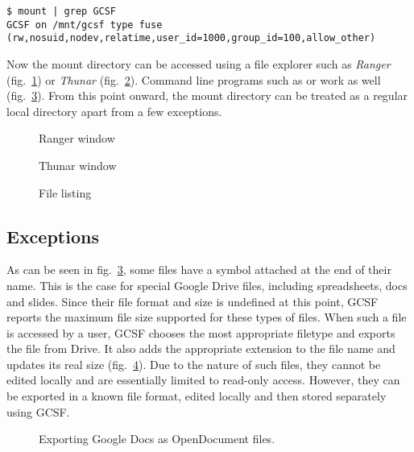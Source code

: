 \begin{lstlisting}[basicstyle=\footnotesize\ttfamily,caption=Output of mount,frame=single,label=mount_output,float]
$ mount | grep GCSF
GCSF on /mnt/gcsf type fuse (rw,nosuid,nodev,relatime,user_id=1000,group_id=100,allow_other)
\end{lstlisting}


Now the mount directory can be accessed using a file explorer such as \emph{Ranger} (fig.~\ref{fig:ranger}) or \emph{Thunar} (fig.~\ref{fig:thunar}). Command line programs such as  or  work as well (fig.~\ref{fig:ls}). From this point onward, the mount directory can be treated as a regular local directory apart from a few exceptions.

\begin{figure}[tbp]
\caption{Ranger window}
\label{fig:ranger}
\centering
{}
\end{figure}

\begin{figure}[tbp]
\caption{Thunar window}
\label{fig:thunar}
\centering
{}
\end{figure}

\begin{figure}[tbp]
  \caption{File listing}
\label{fig:ls}
\centering
\fbox{\texttt{[image: ls]}}
\end{figure}

\subsection{Exceptions}

As can be seen in fig.~\ref{fig:ls}, some files have a \codeword{#} symbol attached at the end of their name. This is the case for special Google Drive files, including spreadsheets, docs and slides. Since their file format and size is undefined at this point, GCSF reports the maximum file size supported for these types of files. When such a file is accessed by a user, GCSF chooses the most appropriate filetype and exports the file from Drive. It also adds the appropriate extension to the file name and updates its real size (fig.~\ref{fig:export_doc}). Due to the nature of such files, they cannot be edited locally and are essentially limited to read-only access. However, they can be exported in a known file format, edited locally and then stored separately using GCSF.

\begin{figure}[tbp]
\caption{Exporting Google Docs as OpenDocument files.}
\label{fig:export_doc}
\centering
{}
\end{figure}


